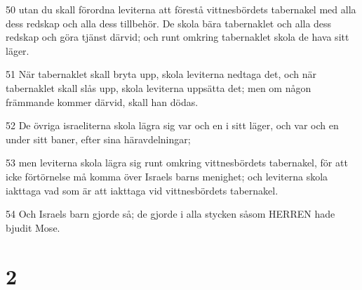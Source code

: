 \par 50 utan du skall förordna leviterna att förestå vittnesbördets tabernakel med alla dess redskap och alla dess tillbehör. De skola bära tabernaklet och alla dess redskap och göra tjänst därvid; och runt omkring tabernaklet skola de hava sitt läger.
\par 51 När tabernaklet skall bryta upp, skola leviterna nedtaga det, och när tabernaklet skall slås upp, skola leviterna uppsätta det; men om någon främmande kommer därvid, skall han dödas.
\par 52 De övriga israeliterna skola lägra sig var och en i sitt läger, och var och en under sitt baner, efter sina häravdelningar;
\par 53 men leviterna skola lägra sig runt omkring vittnesbördets tabernakel, för att icke förtörnelse må komma över Israels barns menighet; och leviterna skola iakttaga vad som är att iakttaga vid vittnesbördets tabernakel.
\par 54 Och Israels barn gjorde så; de gjorde i alla stycken såsom HERREN hade bjudit Mose.

\chapter{2}

